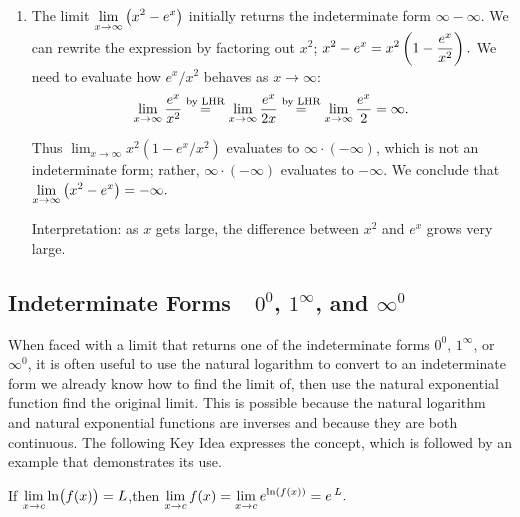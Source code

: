 \begin{example}
\begin{enumerate}
Since $x\to\infty$ implies $\ds\frac{x+1}x\to 1$, it follows that 
\[x\to\infty \quad \text{ implies }\quad \ln\left(\frac{x+1}x\right)\to\ln 1=0.\]

Thus
\[
 \lim_{x\to\infty} \left(\ln(x+1)-\ln x\right)
 = \lim_{x\to \infty} \ln \left(\frac{x+1}x\right)=0.
\]
Interpretation: since this limit evaluates to 0, it means that for large $x$, there is essentially no difference between $\ln (x+1)$ and $\ln x$; their difference is essentially 0.

	\item	The limit $\displaystyle \lim_{x\to\infty} \left(x^2-e^x\right)$ initially returns the indeterminate form $\infty-\infty$. We can rewrite the expression by factoring out $x^2$; $\displaystyle x^2-e^x = x^2\left(1-\frac{e^x}{x^2}\right).$ We need to evaluate how $e^x/x^2$ behaves as $x\to\infty$:
\[
\lim_{x\to\infty}\frac{e^x}{x^2} \mathrel{\overset{\text{by LHR}}{=}} \lim_{x\to\infty} \frac{e^x}{2x}
\mathrel{\overset{\text{by LHR}}{=}} \lim_{x\to\infty} \frac{e^x}{2} = \infty.
\]

Thus $\lim_{x\to\infty}x^2(1-e^x/x^2)$ evaluates to $\infty\cdot(-\infty)$, which is not an indeterminate form; rather, $\infty\cdot(-\infty)$ evaluates to $-\infty$. We conclude that 
$\displaystyle \lim_{x\to\infty} \left(x^2-e^x\right) = -\infty.$

Interpretation: as $x$ gets large, the difference between $x^2$ and $e^x$ grows very large.
\end{enumerate}
\end{example}

\subsection{Indeterminate Forms\ \ \texorpdfstring{$0^0$, $1^\infty$, and $\infty^0$}{0\^{}0, 1\^{}∞, and ∞\^{}0}}

When faced with a limit that returns one of the indeterminate forms $0^0$, $1^\infty$, or $\infty^0$, it is often useful to use the natural logarithm to convert to an indeterminate form we already know how to find the limit of, then use the natural exponential function find the original limit. This is possible because the natural logarithm and natural exponential functions are inverses and because they are both continuous. The following Key Idea expresses the concept, which is followed by an example that demonstrates its use.

\begin{keyidea}\label{idea:LHR_power}%
If $\displaystyle \lim_{x\to c} \ln\bigl(f(x)\bigr) = L$,\quad then 
$\displaystyle \lim_{x\to c} f(x) = \lim_{x\to c} e^{\ln(f(x))} = e\,^L.$ 
\end{keyidea}

